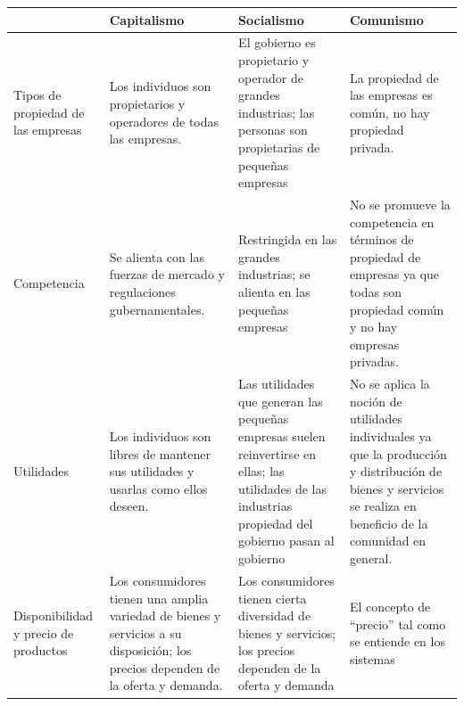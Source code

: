 \documentclass[
  man,
  floatsintext,
  longtable,
  a4paper,
  nolmodern,
  notxfonts,
  notimes,
  12pt,
  colorlinks=true,linkcolor=blue,citecolor=blue,urlcolor=blue]{apa7}
\newcounter{none} %
\begin{document}
{\def\LTcaptype{none} %
\begin{longtable}[]{@{}
  >{\raggedright\arraybackslash}p{}
  >{\raggedright\arraybackslash}p{}
  >{\raggedright\arraybackslash}p{}
  >{\raggedright\arraybackslash}p{}@{}}
\toprule\noalign{}
\begin{minipage}[b]{\linewidth}\raggedright
\end{minipage} & \begin{minipage}[b]{\linewidth}\raggedright
Capitalismo
\end{minipage} & \begin{minipage}[b]{\linewidth}\raggedright
Socialismo
\end{minipage} & \begin{minipage}[b]{\linewidth}\raggedright
Comunismo
\end{minipage} \\
\midrule\noalign{}
\endhead
\bottomrule\noalign{}
\endlastfoot
Tipos de propiedad de las empresas & Los individuos son propietarios y
operadores de todas las empresas. & El gobierno es propietario y
operador de grandes industrias; las personas son propietarias de
pequeñas empresas & La propiedad de las empresas es común, no hay
propiedad privada. \\
Competencia & Se alienta con las fuerzas de mercado y regulaciones
gubernamentales. & Restringida en las grandes industrias; se alienta en
las pequeñas empresas & No se promueve la competencia en términos de
propiedad de empresas ya que todas son propiedad común y no hay empresas
privadas. \\
Utilidades & Los individuos son libres de mantener sus utilidades y
usarlas como ellos deseen. & Las utilidades que generan las pequeñas
empresas suelen reinvertirse en ellas; las utilidades de las industrias
propiedad del gobierno pasan al gobierno & No se aplica la noción de
utilidades individuales ya que la producción y distribución de bienes y
servicios se realiza en beneficio de la comunidad en general. \\
Disponibilidad y precio de productos & Los consumidores tienen una
amplia variedad de bienes y servicios a su disposición; los precios
dependen de la oferta y demanda. & Los consumidores tienen cierta
diversidad de bienes y servicios; los precios dependen de la oferta y
demanda & El concepto de ``precio'' tal como se entiende en los sistemas

\end{longtable}}
\end{document}

